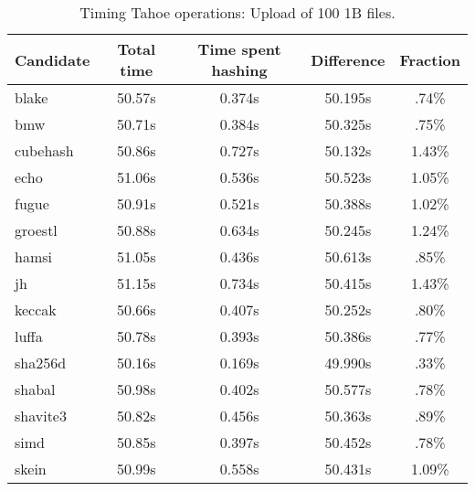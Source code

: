 \begin{table}[h]
  \centering
  \begin{tabular}{ | l | c | c | c | c | }
    \hline
    Candidate & Total time & Time spent hashing & Difference & Fraction \\ \hline
    blake & 50.57s & 0.374s & 50.195s & .74\% \\ \hline
    bmw & 50.71s & 0.384s & 50.325s & .75\% \\ \hline
    cubehash & 50.86s & 0.727s & 50.132s & 1.43\% \\ \hline
    echo & 51.06s & 0.536s & 50.523s & 1.05\% \\ \hline
    fugue & 50.91s & 0.521s & 50.388s & 1.02\% \\ \hline
    groestl & 50.88s & 0.634s & 50.245s & 1.24\% \\ \hline
    hamsi & 51.05s & 0.436s & 50.613s & .85\% \\ \hline
    jh & 51.15s & 0.734s & 50.415s & 1.43\% \\ \hline
    keccak & 50.66s & 0.407s & 50.252s & .80\% \\ \hline
    luffa & 50.78s & 0.393s & 50.386s & .77\% \\ \hline
    sha256d & 50.16s & 0.169s & 49.990s & .33\% \\ \hline
    shabal & 50.98s & 0.402s & 50.577s & .78\% \\ \hline
    shavite3 & 50.82s & 0.456s & 50.363s & .89\% \\ \hline
    simd & 50.85s & 0.397s & 50.452s & .78\% \\ \hline
    skein & 50.99s & 0.558s & 50.431s & 1.09\% \\ \hline
  \end{tabular}
  \caption{Timing Tahoe operations: Upload of 100 1B files.}
  \label{tbl:hashingtimes:put1b}
\end{table}

